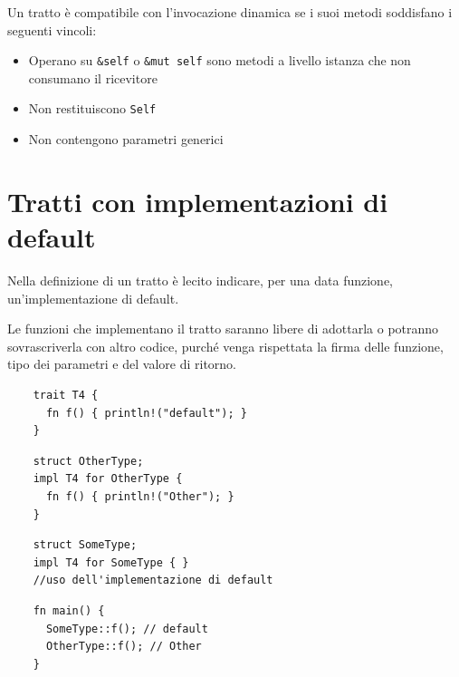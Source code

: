 Un tratto è compatibile con l'invocazione dinamica se i suoi metodi soddisfano i
seguenti vincoli:

\begin{itemize}
  \item Operano su \verb|&self| o \verb|&mut self| sono metodi a livello istanza che non
        consumano il ricevitore
  \item Non restituiscono \verb|Self|
  \item Non contengono parametri generici
\end{itemize}

\section{Tratti con implementazioni di default}
Nella definizione di un tratto è lecito indicare, per una data funzione,
un'implementazione di default.

Le funzioni che implementano il tratto saranno libere di adottarla o potranno
sovrascriverla con altro codice, purché venga rispettata la firma delle funzione,
tipo dei parametri e del valore di ritorno.


\begin{center}
  \begin{minipage}{0.47\linewidth}
    \begin{verbatim}    
    trait T4 {
      fn f() { println!("default"); }
    }
    \end{verbatim}
    \vfill
    \begin{verbatim}    
    struct OtherType;
    impl T4 for OtherType {
      fn f() { println!("Other"); }
    }
    \end{verbatim}

  \end{minipage}
  \hfill
  \begin{minipage}{0.47\linewidth}
    \begin{verbatim}    
    struct SomeType;
    impl T4 for SomeType { }
    //uso dell'implementazione di default
    \end{verbatim}
    \vfill
    \begin{verbatim}    
    fn main() {
      SomeType::f(); // default
      OtherType::f(); // Other
    }
    \end{verbatim}

  \end{minipage}
\end{center}

